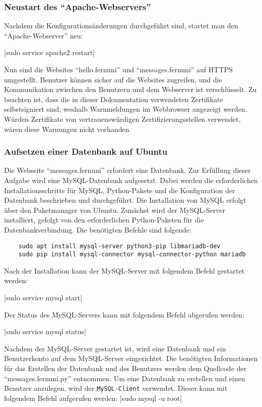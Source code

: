\subsubsection*{Neustart des \enquote{Apache-Webservers}}
Nachdem die Konfigurationsänderungen durchgeführt sind, startet man den \enquote{Apache-Webserver} neu:

|sudo service apache2 restart|

Nun sind die Websites \enquote{hello.fernuni} und \enquote{messages.fernuni} auf HTTPS umgestellt. Benutzer können sicher auf die Websites zugreifen, und die Kommunikation zwischen den Benutzern und dem Webserver ist verschlüsselt.
Zu beachten ist, dass die in dieser Dokumentation verwendeten Zertifikate selbstsigniert sind, weshalb Warnmeldungen im Webbrowser angezeigt werden. Würden Zertifikate von vertrauenswürdigen Zertifizierungsstellen verwendet, wären diese Warnungen nicht vorhanden.

\subsubsection*{ Aufsetzen einer Datenbank auf Ubuntu}

Die Webseite \enquote{messages.fernuni} erfordert eine Datenbank. Zur Erfüllung dieser Aufgabe wird eine MySQL-Datenbank aufgesetzt. Dabei werden die erforderlichen Installationsschritte für MySQL, Python-Pakete und die Konfiguration der Datenbank beschrieben und durchgeführt.
Die Installation von MySQL erfolgt über den Paketmanager von Ubuntu. Zunächst wird der MySQL-Server installiert, gefolgt von den erforderlichen Python-Paketen für die Datenbankverbindung. Die benötigten Befehle sind folgende:

\begin{verbatim}
    sudo apt install mysql-server python3-pip libmariadb-dev
    sudo pip install mysql-connector mysql-connector-python mariadb
\end{verbatim}

Nach der Installation kann der MySQL-Server mit folgendem Befehl gestartet werden:

|sudo service mysql start|

Der Status des MySQL-Servers kann mit folgendem Befehl abgerufen werden:

|sudo service mysql status|

Nachdem der MySQL-Server gestartet ist, wird eine Datenbank und ein Benutzerkonto auf dem MySQL-Server eingerichtet. Die benötigten Informationen für das Erstellen der Datenbank und des Benutzers werden dem Quellcode der \enquote{messages.fernuni.py} entnommen.
Um eine Datenbank zu erstellen und einen Benutzer anzulegen, wird der \verb+MySQL-Client+ verwendet. Dieser kann mit folgendem Befehl aufgerufen werden:
|sudo mysql -u root|

